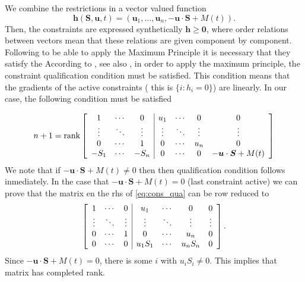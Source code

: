\documentclass[a4paper,10pt]{article}
\theoremstyle{remark}
\newcommand{\bm}[1]{\boldsymbol{#1}}
\begin{document}
We combine the restrictions in a vector valued function 
$$\bm{h}(\bm{S},\bm{u},t)=(\bm{u}_1,\ldots, \bm{u}_n,-\bm{u}\cdot \bm{S}+M(t)).$$
Then, the constraints are expressed synthetically $\bm{h}\geq \bm{0}$, where order relations between vectors mean that these relations are given component by component. Following  to be able to apply the Maximum Principle  it is necessary that they satisfy the  
According to \cite[Th. 4.1]{A.Seierstad499}, see also \cite{hartl1995survey}, in order to apply the maximum principle, the  constraint
qualification condition must be satisfied. This condition  means that the gradients of the active constraints ( this is $ \{i :h_i=0\}$) are linearly. In our case, the following condition must be satisfied

\begin{equation}\label{eq:cons_qua}
n+1=
 \operatorname{rank}
                    \left[
                    \begin{array}{c c c|c c c c }
                      1      & \cdots & 0      & u_1    & \cdots& 0 &  0       \\
                      \vdots & \ddots & \vdots & \vdots & \ddots&\vdots & \vdots   \\
                      0      & \cdots & 1      & 0 &\cdots &  u_n   &   0      \\                                  
                      -S_1   &\cdots  & -S_n      & 0      &\cdots &0 & -\bm{u}\cdot \bm{S}+M(t)\\
                     \end{array}
                    \right]
\end{equation}
We note that if $-\bm{u}\cdot \bm{S}+M(t)\neq 0$ then then qualification condition follows inmediately. In the case that   $-\bm{u}\cdot \bm{S}+M(t)= 0$ (last constraint active) we can  prove  that  the matrix en the rhs of  \eqref{eq:cons_qua} can be row reduced to
\begin{equation*}\label{eq:cons_qua}
                    \left[
                    \begin{array}{c c c|c c c c }
                      1      & \cdots & 0      & u_1    & \cdots& 0 &  0       \\
                      \vdots & \ddots & \vdots & \vdots & \ddots&\vdots & \vdots   \\
                      0      & \cdots & 1      & 0 &\cdots &  u_n   &   0      \\                                  
                      0   &\cdots  & 0      & u_1S_1      &\cdots & u_nS_n & 0\\
                     \end{array}
                    \right].
\end{equation*}
Since $-\bm{u}\cdot \bm{S}+M(t)= 0$, there is some $i$ with $u_iS_i\neq 0$. This implies that matrix has completed rank. 
\end{document}
